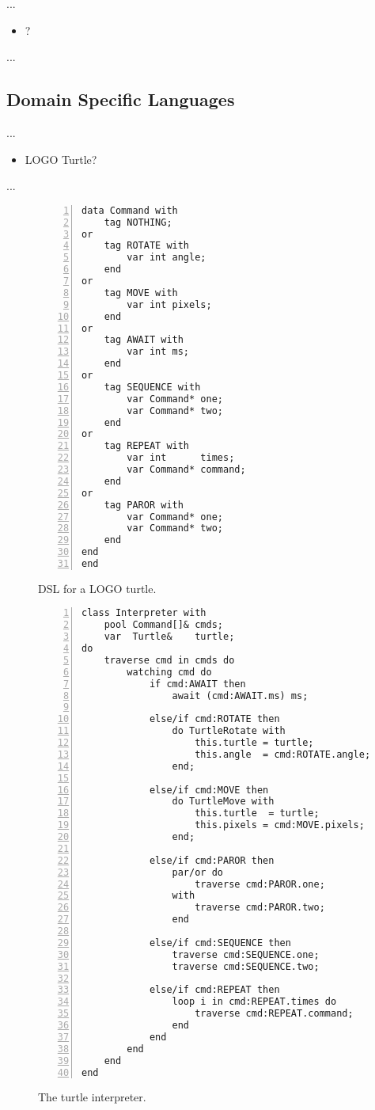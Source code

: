 \documentclass{acm_proc_article-sp}
\begin{document}
...

\begin{itemize}
\item ?
\end{itemize}

...

\subsection{Domain Specific Languages}

...

\begin{itemize}
\item LOGO Turtle?
\end{itemize}

...

\begin{figure}%
\begin{lstlisting}[numbers=left,xleftmargin=3em]
data Command with
    tag NOTHING;
or
    tag ROTATE with
        var int angle;
    end
or
    tag MOVE with
        var int pixels;
    end
or
    tag AWAIT with
        var int ms;
    end
or
    tag SEQUENCE with
        var Command* one;
        var Command* two;
    end
or
    tag REPEAT with
        var int      times;
        var Command* command;
    end
or
    tag PAROR with
        var Command* one;
        var Command* two;
    end
end
end
\end{lstlisting}
\caption{ DSL for a LOGO turtle.
\label{lst.turtle.dsl}
}
\end{figure}

\begin{figure}%
\begin{lstlisting}[numbers=left,xleftmargin=3em]
class Interpreter with
    pool Command[]& cmds;
    var  Turtle&    turtle;
do
    traverse cmd in cmds do
        watching cmd do
            if cmd:AWAIT then
                await (cmd:AWAIT.ms) ms;

            else/if cmd:ROTATE then
                do TurtleRotate with
                    this.turtle = turtle;
                    this.angle  = cmd:ROTATE.angle;
                end;

            else/if cmd:MOVE then
                do TurtleMove with
                    this.turtle  = turtle;
                    this.pixels = cmd:MOVE.pixels;
                end;

            else/if cmd:PAROR then
                par/or do
                    traverse cmd:PAROR.one;
                with
                    traverse cmd:PAROR.two;
                end

            else/if cmd:SEQUENCE then
                traverse cmd:SEQUENCE.one;
                traverse cmd:SEQUENCE.two;

            else/if cmd:REPEAT then
                loop i in cmd:REPEAT.times do
                    traverse cmd:REPEAT.command;
                end
            end
        end
    end
end
\end{lstlisting}
\caption{ The turtle interpreter.
\label{lst.turtle.interpreter}
}
\end{figure}
\end{document}
